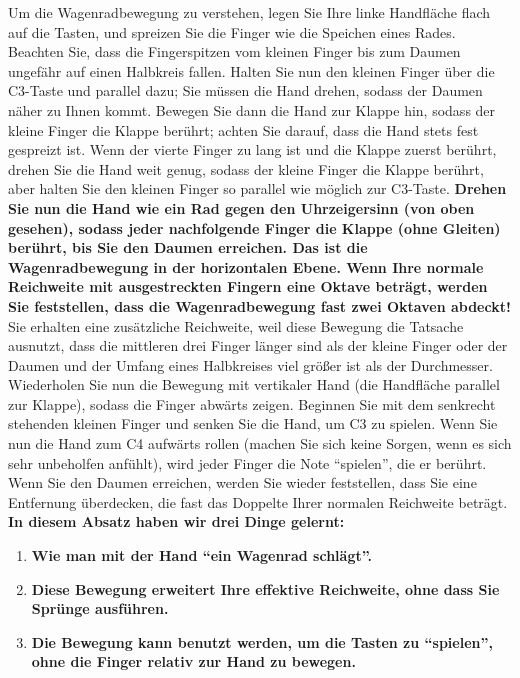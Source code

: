 Um die Wagenradbewegung zu verstehen, legen Sie Ihre linke Handfläche flach auf die Tasten, und spreizen Sie die Finger wie die Speichen eines Rades.
Beachten Sie, dass die Fingerspitzen vom kleinen Finger bis zum Daumen ungefähr auf einen Halbkreis fallen.
Halten Sie nun den kleinen Finger über die C3-Taste und parallel dazu; Sie müssen die Hand drehen, sodass der Daumen näher zu Ihnen kommt.
Bewegen Sie dann die Hand zur Klappe hin, sodass der kleine Finger die Klappe berührt; achten Sie darauf, dass die Hand stets fest gespreizt ist.
Wenn der vierte Finger zu lang ist und die Klappe zuerst berührt, drehen Sie die Hand weit genug, sodass der kleine Finger die Klappe berührt, aber halten Sie den kleinen Finger so parallel wie möglich zur C3-Taste.
\textbf{Drehen Sie nun die Hand wie ein Rad gegen den Uhrzeigersinn (von oben gesehen), sodass jeder nachfolgende Finger die Klappe (ohne Gleiten) berührt, bis Sie den Daumen erreichen.
Das ist die Wagenradbewegung in der horizontalen Ebene.
Wenn Ihre normale Reichweite mit ausgestreckten Fingern eine Oktave beträgt, werden Sie feststellen, dass die Wagenradbewegung fast zwei Oktaven abdeckt!}
Sie erhalten eine zusätzliche Reichweite, weil diese Bewegung die Tatsache ausnutzt, dass die mittleren drei Finger länger sind als der kleine Finger oder der Daumen und der Umfang eines Halbkreises viel größer ist als der Durchmesser.
Wiederholen Sie nun die Bewegung mit vertikaler Hand (die Handfläche parallel zur Klappe), sodass die Finger abwärts zeigen.
Beginnen Sie mit dem senkrecht stehenden kleinen Finger und senken Sie die Hand, um C3 zu spielen.
Wenn Sie nun die Hand zum C4 aufwärts rollen (machen Sie sich keine Sorgen, wenn es sich sehr unbeholfen anfühlt), wird jeder Finger die Note \enquote{spielen}, die er berührt.
Wenn Sie den Daumen erreichen, werden Sie wieder feststellen, dass Sie eine Entfernung überdecken, die fast das Doppelte Ihrer normalen Reichweite beträgt.
\textbf{In diesem Absatz haben wir drei Dinge gelernt:}

\begin{enumerate} 
 \item \textbf{Wie man mit der Hand \enquote{ein Wagenrad schlägt}.}
 \item \textbf{Diese Bewegung erweitert Ihre effektive Reichweite, ohne dass Sie Sprünge ausführen.}
 \item \textbf{Die Bewegung kann benutzt werden, um die Tasten zu \enquote{spielen}, ohne die Finger relativ zur Hand zu bewegen.}
\end{enumerate}

